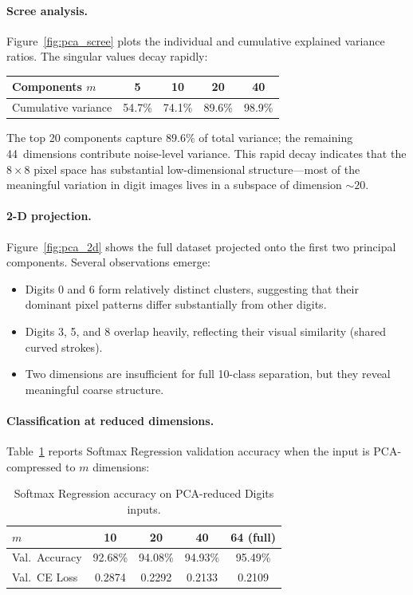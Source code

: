 \documentclass[11pt]{article}
\begin{document}
\paragraph{Scree analysis.}
Figure~\ref{fig:pca_scree} plots the individual and cumulative explained variance ratios.
The singular values decay rapidly:

\begin{center}
\begin{tabular}{@{}lcccc@{}}
\toprule
Components $m$ & 5 & 10 & 20 & 40 \\
\midrule
Cumulative variance & 54.7\% & 74.1\% & 89.6\% & 98.9\% \\
\bottomrule
\end{tabular}
\end{center}

\noindent
The top 20 components capture $89.6\%$ of total variance; the remaining 44~dimensions
contribute noise-level variance.  This rapid decay indicates that the $8{\times}8$
pixel space has substantial low-dimensional structure---most of the meaningful variation
in digit images lives in a subspace of dimension ${\sim}20$.

\paragraph{2-D projection.}
Figure~\ref{fig:pca_2d} shows the full dataset projected onto the first two principal
components.  Several observations emerge:
\begin{itemize}[leftmargin=1.4em,itemsep=0.15em]
  \item Digits 0 and 6 form relatively distinct clusters, suggesting that their dominant
        pixel patterns differ substantially from other digits.
  \item Digits 3, 5, and 8 overlap heavily, reflecting their visual similarity
        (shared curved strokes).
  \item Two dimensions are insufficient for full 10-class separation, but they reveal
        meaningful coarse structure.
\end{itemize}

\paragraph{Classification at reduced dimensions.}
Table~\ref{tab:pca} reports Softmax Regression validation accuracy when the input is
PCA-compressed to $m$ dimensions:

\begin{table}[H]
\centering
\caption{Softmax Regression accuracy on PCA-reduced Digits inputs.}
\label{tab:pca}
\begin{tabular}{@{}lcccc@{}}
\toprule
$m$ & 10 & 20 & 40 & 64 (full) \\
\midrule
Val.\ Accuracy & 92.68\% & 94.08\% & 94.93\% & 95.49\% \\
Val.\ CE Loss  & 0.2874  & 0.2292  & 0.2133  & 0.2109  \\
\bottomrule
\end{tabular}
\end{table}
\end{document}
